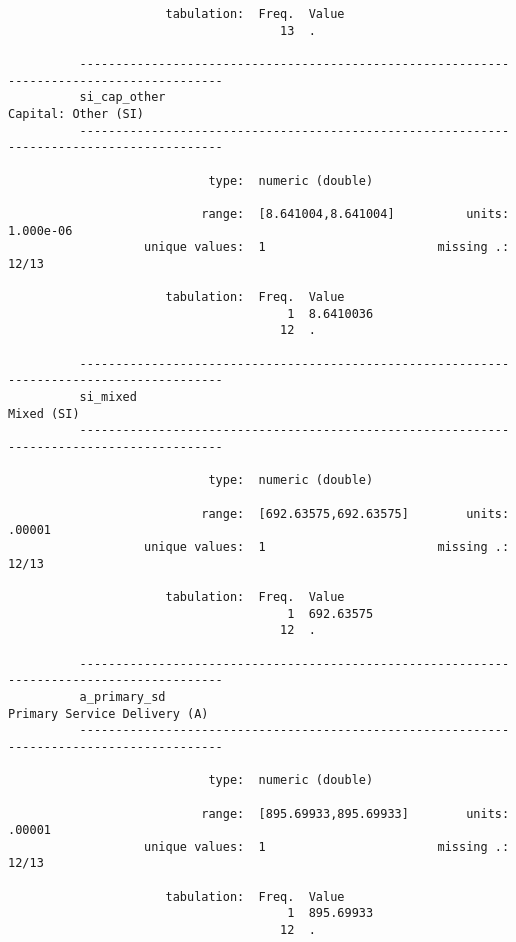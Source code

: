 \documentclass{article}
\begin{document}
\begin{verbatim}
                      tabulation:  Freq.  Value
                                      13  .
          
          ------------------------------------------------------------------------------------------
          si_cap_other                                                           Capital: Other (SI)
          ------------------------------------------------------------------------------------------
          
                            type:  numeric (double)
          
                           range:  [8.641004,8.641004]          units:  1.000e-06
                   unique values:  1                        missing .:  12/13
          
                      tabulation:  Freq.  Value
                                       1  8.6410036
                                      12  .
          
          ------------------------------------------------------------------------------------------
          si_mixed                                                                        Mixed (SI)
          ------------------------------------------------------------------------------------------
          
                            type:  numeric (double)
          
                           range:  [692.63575,692.63575]        units:  .00001
                   unique values:  1                        missing .:  12/13
          
                      tabulation:  Freq.  Value
                                       1  692.63575
                                      12  .
          
          ------------------------------------------------------------------------------------------
          a_primary_sd                                                  Primary Service Delivery (A)
          ------------------------------------------------------------------------------------------
          
                            type:  numeric (double)
          
                           range:  [895.69933,895.69933]        units:  .00001
                   unique values:  1                        missing .:  12/13
          
                      tabulation:  Freq.  Value
                                       1  895.69933
                                      12  .
          

\end{verbatim}
\end{document}
